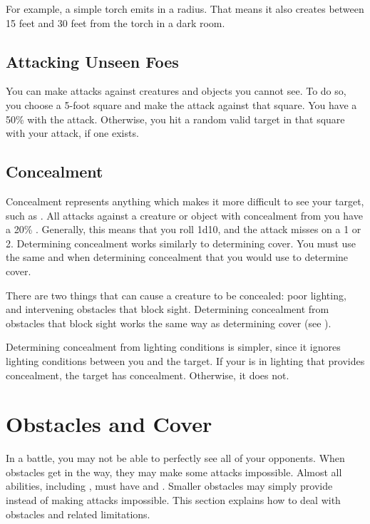     For example, a simple torch emits  in a \smallarea radius.
    That means it also creates  between 15 feet and 30 feet from the torch in a dark room.

  \subsection{Attacking Unseen Foes}
    You can make  attacks against creatures and objects you cannot see.
    To do so, you choose a 5-foot square and make the attack against that square.
    You have a 50\%  with the attack.
    Otherwise, you hit a random valid target in that square with your attack, if one exists.

  \subsection{Concealment}\label{Concealment}
    Concealment represents anything which makes it more difficult to see your target, such as .
    All  attacks against a creature or object with concealment from you have a 20\% .
    Generally, this means that you roll 1d10, and the attack misses on a 1 or 2.
    Determining concealment works similarly to determining cover.
    You must use the same  and  when determining concealment that you would use to determine cover.

     There are two things that can cause a creature to be concealed: poor lighting, and intervening obstacles that block sight.
    Determining concealment from obstacles that block sight works the same way as determining cover (see ).

    Determining concealment from lighting conditions is simpler, since it ignores lighting conditions between you and the target.
    If your  is in lighting that provides concealment, the target has concealment.
    Otherwise, it does not.

\section{Obstacles and Cover}\label{Obstacles and Cover}
  In a battle, you may not be able to perfectly see all of your opponents.
  When obstacles get in the way, they may make some attacks impossible.
  Almost all abilities, including , must have  and .
  Smaller obstacles may simply provide  instead of making attacks impossible.
  This section explains how to deal with obstacles and related limitations.

